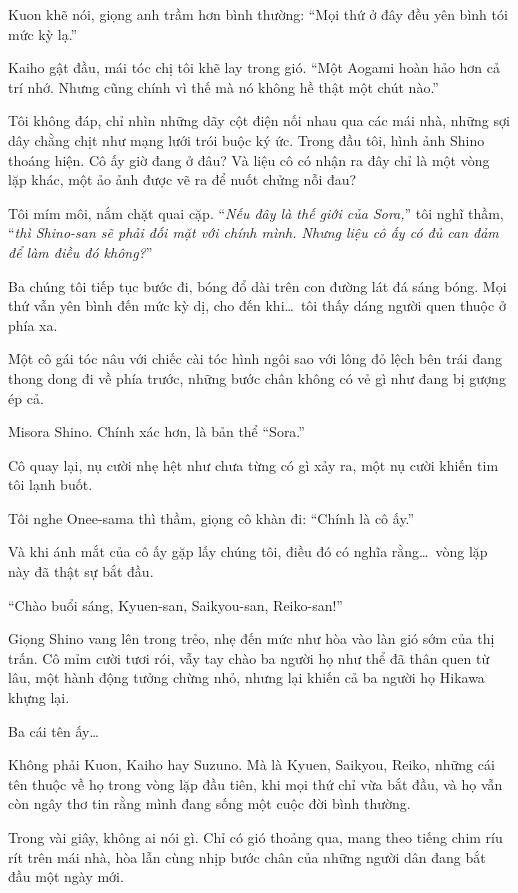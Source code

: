 \documentclass[../main.tex]{subfiles}
\begin{document}
Kuon khẽ nói, giọng anh trầm hơn bình thường: ``Mọi thứ ở đây đều yên bình tói mức kỳ lạ.''

Kaiho gật đầu, mái tóc chị tôi khẽ lay trong gió. ``Một Aogami hoàn hảo hơn cả trí nhớ. Nhưng cũng chính vì thế mà nó không hề thật một chút nào.''

Tôi không đáp, chỉ nhìn những dãy cột điện nối nhau qua các mái nhà, những sợi dây chằng chịt như mạng lưới trói buộc ký ức. Trong đầu tôi, hình ảnh Shino thoáng hiện. Cô ấy giờ đang ở đâu? Và liệu cô có nhận ra đây chỉ là một vòng lặp khác, một ảo ảnh được vẽ ra để nuốt chửng nỗi đau?

Tôi mím môi, nắm chặt quai cặp. ``\textit{Nếu đây là thế giới của Sora,}'' tôi nghĩ thầm, ``\textit{thì Shino-san sẽ phải đối mặt với chính mình. Nhưng liệu cô ấy có đủ can đảm để làm điều đó không?}''

Ba chúng tôi tiếp tục bước đi, bóng đổ dài trên con đường lát đá sáng bóng. Mọi thứ vẫn yên bình đến mức kỳ dị, cho đến khi\dots\ tôi thấy dáng người quen thuộc ở phía xa.

Một cô gái tóc nâu với chiếc cài tóc hình ngôi sao với lông đỏ lệch bên trái đang thong dong đi về phía trước, những bước chân không có vẻ gì như đang bị gượng ép cả.

Misora Shino. Chính xác hơn, là bản thể ``Sora.''

Cô quay lại, nụ cười nhẹ hệt như chưa từng có gì xảy ra, một nụ cười khiến tim tôi lạnh buốt.

Tôi nghe Onee-sama thì thầm, giọng cô khàn đi: ``Chính là cô ấy.''

Và khi ánh mắt của cô ấy gặp lấy chúng tôi, điều đó có nghĩa rằng\dots\ vòng lặp này đã thật sự bắt đầu.

\pov{-}

``Chào buổi sáng, Kyuen-san, Saikyou-san, Reiko-san!''

Giọng Shino vang lên trong trẻo, nhẹ đến mức như hòa vào làn gió sớm của thị trấn. Cô mỉm cười tươi rói, vẫy tay chào ba người họ như thể đã thân quen từ lâu, một hành động tưởng chừng nhỏ, nhưng lại khiến cả ba người họ Hikawa khựng lại.

Ba cái tên ấy\dots

Không phải Kuon, Kaiho hay Suzuno. Mà là Kyuen, Saikyou, Reiko, những cái tên thuộc về họ trong vòng lặp đầu tiên, khi mọi thứ chỉ vừa bắt đầu, và họ vẫn còn ngây thơ tin rằng mình đang sống một cuộc đời bình thường.

Trong vài giây, không ai nói gì. Chỉ có gió thoảng qua, mang theo tiếng chim ríu rít trên mái nhà, hòa lẫn cùng nhịp bước chân của những người dân đang bắt đầu một ngày mới.
\end{document}
